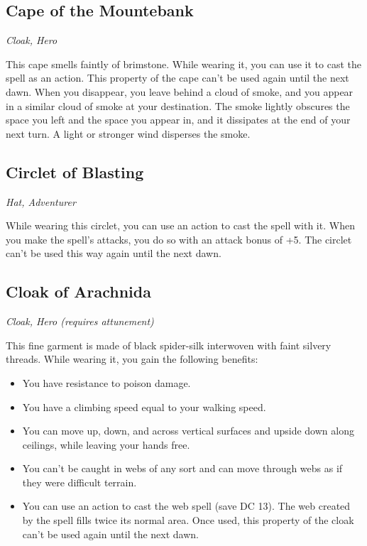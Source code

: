 \subsection{Cape of the Mountebank}
\textit{Cloak, Hero}

This cape smells faintly of brimstone. While wearing it, you can use it to cast the  spell as an action. This property of the cape can't be used again until the next dawn. When you disappear, you leave behind a cloud of smoke, and you appear in a similar cloud of smoke at your destination. The smoke lightly obscures the space you left and the space you appear in, and it dissipates at the end of your next turn. A light or stronger wind disperses the smoke.

\subsection{Circlet of Blasting}
\textit{Hat, Adventurer}

While wearing this circlet, you can use an action to cast the  spell with it. When you make the spell's attacks, you do so with an attack bonus of +5. The circlet can't be used this way again until the next dawn.

\subsection{Cloak of Arachnida}
\textit{Cloak, Hero (requires attunement)} 

This fine garment is made of black spider-silk interwoven with faint silvery threads. While wearing it, you gain the following benefits:
\begin{itemize}
 \item You have resistance to poison damage.
 \item You have a climbing speed equal to your walking speed.
 \item You can move up, down, and across vertical surfaces and upside down along ceilings, while leaving your hands free.
 \item You can't be caught in webs of any sort and can move through webs as if they were difficult terrain.
 \item You can use an action to cast the web spell (save DC 13). The web created by the spell fills twice its normal area. Once used, this property of the cloak can't be used again until the next dawn.
\end{itemize}

